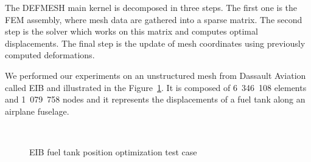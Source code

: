 \documentclass[10pt]{IOS-Book-Article}
\begin{document}
The DEFMESH main kernel is decomposed in three steps.
The first one is the FEM assembly, where mesh data are gathered into a sparse matrix.
The second step is the solver which works on this matrix and computes optimal displacements.
The final step is the update of mesh coordinates using previously computed deformations.

We performed our experiments on an unstructured mesh from Dassault Aviation called EIB and illustrated in the Figure~\ref{fig:reservoir}.
It is composed of 6~346~108 elements and 1~079~758 nodes and it represents the displacements of a fuel tank along an airplane fuselage.

\begin{figure}[htp]
 \\
 \caption{EIB fuel tank position optimization test case}
 \label{fig:reservoir}
\end{figure}
\end{document}
